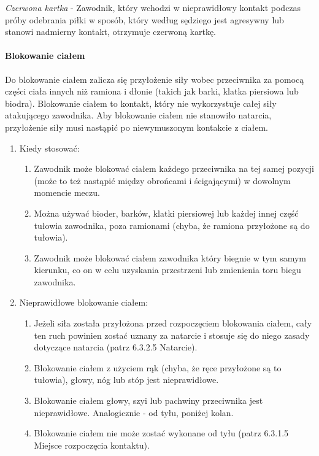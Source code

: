 \documentclass[12pt]{article}
\begin{document}
\emph{Czerwona kartka} - Zawodnik, który wchodzi w nieprawidłowy kontakt
podczas próby odebrania piłki w sposób, który według sędziego jest
agresywny lub stanowi nadmierny kontakt, otrzymuje czerwoną kartkę.

\paragraph{Blokowanie ciałem}
Do blokowanie ciałem zalicza się
przyłożenie siły wobec przeciwnika za pomocą części ciała innych niż
ramiona i dłonie (takich jak barki, klatka piersiowa lub biodra).
Blokowanie ciałem to kontakt, który nie wykorzystuje całej siły
atakującego zawodnika. Aby blokowanie ciałem nie stanowiło natarcia,
przyłożenie siły musi nastąpić po niewymuszonym kontakcie z ciałem.

\begin{enumerate}
\item
    Kiedy stosować:
  
  \begin{enumerate}
  \item
        Zawodnik może blokować ciałem każdego przeciwnika na tej samej
    pozycji (może to też nastąpić między obrońcami i ścigającymi) w
    dowolnym momencie meczu.
      \item
        Można używać bioder, barków, klatki piersiowej lub każdej innej
    część tułowia zawodnika, poza ramionami (chyba, że ramiona
    przyłożone są do tułowia).
      \item
        Zawodnik może blokować ciałem zawodnika który biegnie w tym samym
    kierunku, co on w celu uzyskania przestrzeni lub zmienienia toru
    biegu zawodnika.
      \end{enumerate}
\item
    Nieprawidłowe blokowanie ciałem:
  
  \begin{enumerate}
  \item
        Jeżeli siła została przyłożona przed rozpoczęciem blokowania ciałem,
    cały ten ruch powinien zostać uznany za natarcie i stosuje się do
    niego zasady dotyczące natarcia (patrz 6.3.2.5 Natarcie).
      \item
        Blokowanie ciałem z użyciem rąk (chyba, że ręce przyłożone są to
    tułowia), głowy, nóg lub stóp jest nieprawidłowe.
      \item
        Blokowanie ciałem głowy, szyi lub pachwiny przeciwnika jest
    nieprawidłowe. Analogicznie - od tyłu, poniżej kolan.
      \item
        Blokowanie ciałem nie może zostać wykonane od tyłu (patrz 6.3.1.5
    Miejsce rozpoczęcia kontaktu).
      \end{enumerate}
\end{enumerate}
\end{document}
